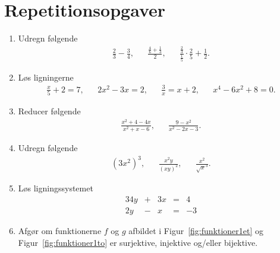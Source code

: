 \section{Repetitionsopgaver}
\begin{enumerate}
	\item Udregn følgende
	\begin{align*}
	\frac{2}{3}-\frac{3}{4},&& \frac{\frac{4}{6}+\frac{1}{3}}{2},&& \frac{\frac{2}{3}}{\frac{1}{5}} \cdot \frac{2}{5}+\frac{1}{2}.
	\end{align*}
	\item Løs ligningerne
	\begin{align*}
	\frac{x}{5}+2=7,&& 2x^2-3x=2,&& \frac{3}{x}=x+2,&& x^4-6x^2+8=0.
	\end{align*}
	\item Reducer følgende
	\begin{align*}
	\frac{x^2+4-4x}{x^2+x-6},&& \frac{9-x^2}{x^2-2x-3}.
	\end{align*}
	\item Udregn følgende
	\begin{align*}
	(3x^2)^3,&& \frac{x^2y}{(xy)^2},&& \frac{x^2}{\sqrt{x}^3}.
	\end{align*}
	\item Løs ligningssystemet 
	\begin{alignat*}{3}
	4y&{}+{}&3x&{}={}&4\\
	2y&{}-{}&x&{}={}&-3
	\end{alignat*}
	\item Afgør om funktionerne $f$ og $g$ afbildet i Figur~\ref{fig:funktioner1et} og Figur~\ref{fig:funktioner1to} er surjektive, injektive og/eller bijektive.
	\begin{figure}[!htbp]
		\begin{minipage}{0.49\textwidth}
			\pgfplotsset{width=0.5\textwidth,compat=1.11}
			\centering
\end{minipage}
\end{figure}
\end{enumerate}
